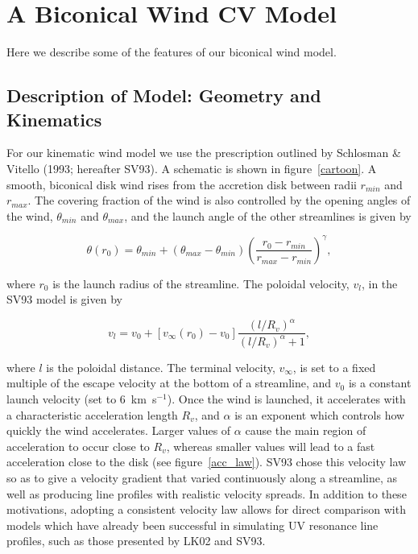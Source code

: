 \documentclass[preprint, a4paper, 11pt]{aastex}
\begin{document}
\section{A Biconical Wind CV Model}

Here we describe some of the features of our biconical wind model. 

\subsection{Description of Model: Geometry and Kinematics}

For our kinematic wind model we use 
the prescription outlined by Schlosman \& Vitello (1993; hereafter SV93). A schematic is shown
in figure~\ref{cartoon}. A smooth, biconical
disk wind rises from the accretion disk between radii $r_{min}$ and $r_{max}$. The covering fraction of the wind is 
also controlled by the opening angles of the wind, $\theta_{min}$ and $\theta_{max}$, and the launch angle of
the other streamlines is given by

\begin{equation}
\theta(r_0) = \theta_{min} + (\theta_{max} - \theta_{min}) \left(\frac{r_0 - r_{min}}{r_{max} - r_{min}} \right)^{\gamma},
\label{theta}
\end{equation}

where $r_0$ is the launch radius of the streamline.
The poloidal velocity, $v_l$, in the SV93 model is given by

\begin{equation}
v_l=v_0+\left[v_{\infty}(r_0)-v_0\right]\frac{\left(l/R_v\right)^{\alpha}}{\left(l/R_v\right)^{\alpha}+1},
\label{v_law}
\end{equation}

where $l$ is the poloidal distance. The terminal velocity, 
$v_{\infty}$, is set to a fixed multiple of the escape velocity at the bottom
of a streamline, and $v_0$ is a constant launch velocity (set to $6$~km~s$^{-1}$).
Once the wind is launched, it accelerates with a characteristic acceleration
length $R_v$, and $\alpha$ is an exponent which controls how quickly the 
wind accelerates. Larger values of $\alpha$ cause the main region of 
acceleration to occur close to $R_v$, whereas smaller values will lead
to a fast acceleration close to the disk (see figure~\ref{acc_law}).
SV93 chose this velocity law so as to give a 
velocity gradient that varied continuously along a streamline, as well
as producing line profiles with realistic velocity spreads.
In addition to these motivations, adopting a consistent velocity law 
allows for direct comparison with models which have already been successful in 
simulating UV resonance line profiles, such as those presented by LK02 and SV93.  
\end{document}
